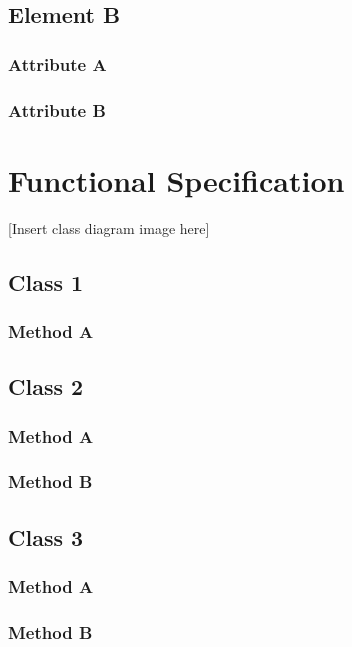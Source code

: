 \documentclass[]{article}
\begin{document}
\subsection{Element B}

\subsubsection{Attribute A}

\subsubsection{Attribute B}


\newpage
\section{Functional Specification}

[Insert class diagram image here]

\subsection{Class 1}

\subsubsection{Method A}

\subsection{Class 2}

\subsubsection{Method A}

\subsubsection{Method B}

\subsection{Class 3}

\subsubsection{Method A}

\subsubsection{Method B}
\end{document}
